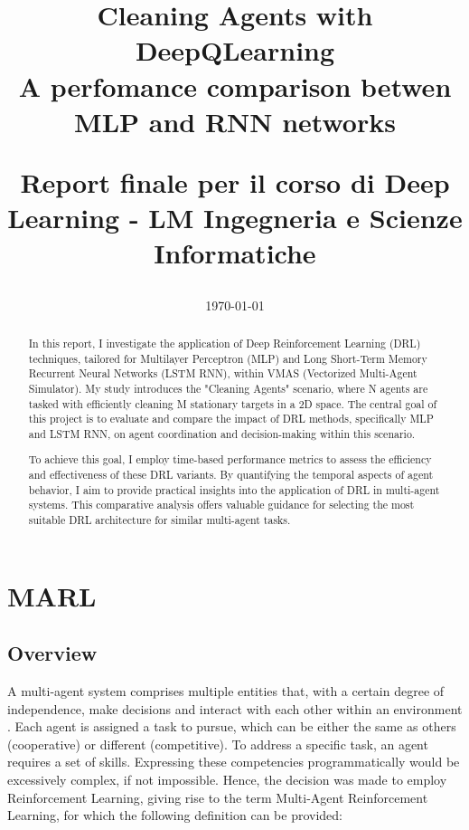 \documentclass{scrartcl}
\title{Cleaning Agents with DeepQLearning
\\
A perfomance comparison betwen MLP and RNN networks
\\
\begin{small} 
  Report finale per il corso di Deep Learning  - 
  LM Ingegneria e Scienze Informatiche
\end{small}
}
\author{
    \emailaddr{filippo.cavallari2@studio.unibo.it}
}
\date{\today}
\begin{document}
\maketitle

\newpage

\begin{abstract}
  In this report, I investigate the application of Deep Reinforcement Learning (DRL) techniques, tailored for 
  Multilayer Perceptron (MLP) and Long Short-Term Memory Recurrent Neural Networks (LSTM RNN), within VMAS 
  (Vectorized Multi-Agent Simulator).
  My study introduces the "Cleaning Agents" scenario, where N agents are tasked with efficiently cleaning M 
  stationary targets in a 2D space. The central goal of this project is to evaluate and compare the impact of 
  DRL methods, specifically MLP and LSTM RNN, on agent coordination and decision-making within this scenario.
  
  To achieve this goal, I employ time-based performance metrics to assess the efficiency and effectiveness of 
  these DRL variants. By quantifying the temporal aspects of agent behavior, I aim to provide practical insights 
  into the application of DRL in multi-agent systems. This comparative analysis offers valuable guidance for selecting the 
  most suitable DRL architecture for similar multi-agent tasks.\end{abstract}
\newpage
\tableofcontents

\newpage
\listoffigures

\newpage

\section{MARL}

\subsection{Overview}
A multi-agent system comprises multiple entities that, with a certain degree of independence, make decisions 
and interact with each other within an environment \cite{weiss1999multiagent}. Each agent is assigned a task to pursue, which can be 
either the same as others (cooperative) or different (competitive). To address a specific task, an agent 
requires a set of skills. Expressing these competencies programmatically would be excessively complex, if not 
impossible. Hence, the decision was made to employ Reinforcement Learning, giving rise to the term Multi-Agent 
Reinforcement Learning, for which the following definition can be provided:
\end{document}

